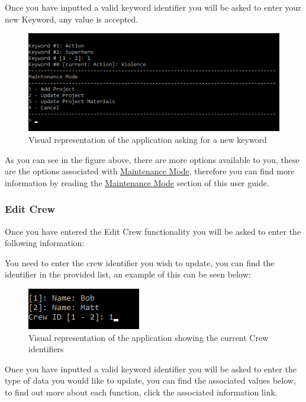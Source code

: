 \documentclass[
  english,
  a4paper,
,tablecaptionabove
]{scrartcl}
\begin{document}
Once you have inputted a valid keyword identifier you will be asked to
enter your new Keyword, any value is accepted.

\begin{figure}
\centering
\includegraphics{images/user-guide/maintenance-mode/update-project-keyword.png}
\caption{Visual representation of the application asking for a new
keyword}
\end{figure}

As you can see in the figure above, there are more options available to
you, these are the options associated with
\protect\hyperlink{using-maintenance-mode}{Maintenance Mode}, therefore
you can find more information by reading the
\protect\hyperlink{using-maintenance-mode}{Maintenance Mode} section of
this user guide.

\newpage

\hypertarget{edit-crew-1}{%
\subsubsection{Edit Crew}\label{edit-crew-1}}

Once you have entered the Edit Crew functionality you will be asked to
enter the following information:

You need to enter the crew identifier you wish to update, you can find
the identifier in the provided list, an example of this can be seen
below:

\begin{figure}
\centering
\includegraphics{images/user-guide/maintenance-mode/update-project-select-crew.png}
\caption{Visual representation of the application showing the current
Crew identifiers}
\end{figure}

Once you have inputted a valid keyword identifier you will be asked to
enter the type of data you would like to update, you can find the
associated values below, to find out more about each function, click the
associated information link.
\end{document}
